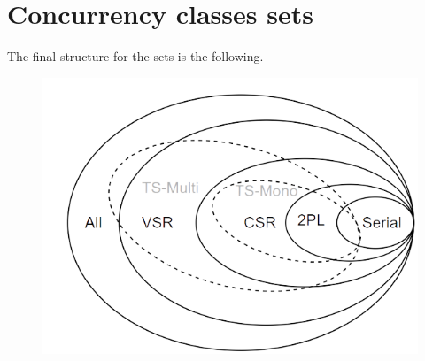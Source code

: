 \section{Concurrency classes sets}

The final structure for the sets is the following. 
\begin{figure}[H]
    \centering
    \includegraphics[width=0.75\linewidth]{images/set.png}
\end{figure}